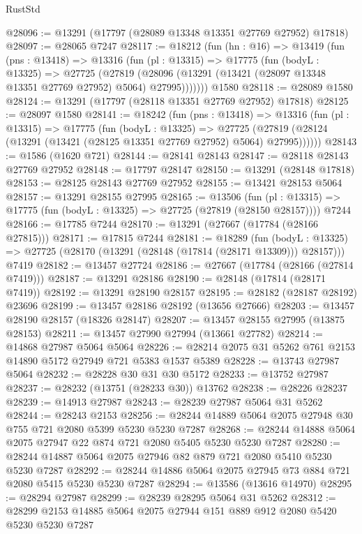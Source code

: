 \begin{lexlean}{RustStd}
\begin{coremodule}
@28096 := @13291 (@17797 (@28089 @13348 @13351 @27769 @27952) @17818)
@28097 := @28065 @7247
@28117 := @18212
    (fun (hn : @16) =>
    @13419
      (fun (pns : @13418) =>
      @13316
        (fun (pl : @13315) =>
        @17775
          (fun (bodyL : @13325) =>
          @27725
            (@27819
              (@28096 (@13291 (@13421 (@28097 @13348 @13351 @27769 @27952) @5064) @27995)))))))
    @1580
@28118 := @28089 @1580
@28124 := @13291 (@17797 (@28118 @13351 @27769 @27952) @17818)
@28125 := @28097 @1580
@28141 := @18242
    (fun (pns : @13418) =>
    @13316
      (fun (pl : @13315) =>
      @17775
        (fun (bodyL : @13325) =>
        @27725 (@27819 (@28124 (@13291 (@13421 (@28125 @13351 @27769 @27952) @5064) @27995))))))
@28143 := @1586 (@1620 @721)
@28144 := @28141 @28143
@28147 := @28118 @28143 @27769 @27952
@28148 := @17797 @28147
@28150 := @13291 (@28148 @17818)
@28153 := @28125 @28143 @27769 @27952
@28155 := @13421 @28153 @5064
@28157 := @13291 @28155 @27995
@28165 := @13506
    (fun (pl : @13315) => @17775 (fun (bodyL : @13325) => @27725 (@27819 (@28150 @28157))))
    @7244
@28166 := @17785 @7244
@28170 := @13291 (@27667 (@17784 (@28166 @27815)))
@28171 := @17815 @7244
@28181 := @18289
    (fun (bodyL : @13325) => @27725 (@28170 (@13291 (@28148 (@17814 (@28171 @13309))) @28157)))
    @7419
@28182 := @13457 @27724
@28186 := @27667 (@17784 (@28166 (@27814 @7419)))
@28187 := @13291 @28186
@28190 := @28148 (@17814 (@28171 @7419))
@28192 := @13291 @28190 @28157
@28195 := @28182 (@28187 @28192) @23696
@28199 := @13457 @28186 @28192 (@13656 @27666)
@28203 := @13457 @28190 @28157 (@18326 @28147)
@28207 := @13457 @28155 @27995 (@13875 @28153)
@28211 := @13457 @27990 @27994 (@13661 @27782)
@28214 := @14868 @27987 @5064 @5064
@28226 := @28214 @2075 @31 @5262 @761 @2153 @14890 @5172 @27949 @721 @5383 @1537 @5389
@28228 := @13743 @27987 @5064
@28232 := @28228 @30 @31 @30 @5172
@28233 := @13752 @27987
@28237 := @28232 (@13751 (@28233 @30)) @13762
@28238 := @28226 @28237
@28239 := @14913 @27987
@28243 := @28239 @27987 @5064 @31 @5262
@28244 := @28243 @2153
@28256 := @28244 @14889 @5064 @2075 @27948 @30 @755 @721 @2080 @5399 @5230 @5230 @7287
@28268 := @28244 @14888 @5064 @2075 @27947 @22 @874 @721 @2080 @5405 @5230 @5230 @7287
@28280 := @28244 @14887 @5064 @2075 @27946 @82 @879 @721 @2080 @5410 @5230 @5230 @7287
@28292 := @28244 @14886 @5064 @2075 @27945 @73 @884 @721 @2080 @5415 @5230 @5230 @7287
@28294 := @13586 (@13616 @14970)
@28295 := @28294 @27987
@28299 := @28239 @28295 @5064 @31 @5262
@28312 := @28299 @2153 @14885 @5064 @2075 @27944 @151 @889 @912 @2080 @5420 @5230 @5230 @7287

\end{coremodule}
\end{lexlean}
